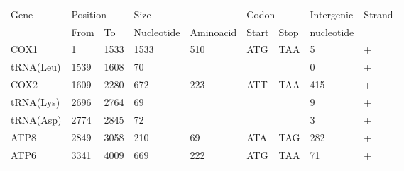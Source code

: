 \documentclass[../DISSERTACAO_MAIN.tex]{subfiles}
\begin{document}
\begin{longtable}{llllllllllllllllllllll}
			Gene         & \multicolumn{3}{l}{Position}               & \multicolumn{5}{l}{Size}                                                       & \multicolumn{6}{l}{Codon}                                     & \multicolumn{3}{l}{Intergenic}  & \multicolumn{4}{l}{Strand}             \\
			& From           & \multicolumn{2}{l}{To}    & \multicolumn{2}{l}{Nucleotide} & \multicolumn{3}{l}{Aminoacid}                 & \multicolumn{3}{l}{Start}         & \multicolumn{3}{l}{Stop}  & \multicolumn{3}{l}{nucleotide}  & \multicolumn{4}{l}{}                   \\
			COX1         & 1              & \multicolumn{2}{l}{1533}  & \multicolumn{2}{l}{1533}       & \multicolumn{3}{l}{510}                       & \multicolumn{3}{l}{ATG}           & \multicolumn{3}{l}{TAA}   & \multicolumn{3}{l}{5}           & \multicolumn{4}{l}{+}                  \\
			tRNA(Leu)    & 1539           & \multicolumn{2}{l}{1608}  & \multicolumn{2}{l}{70}         & \multicolumn{3}{l}{}                          & \multicolumn{3}{l}{}              & \multicolumn{3}{l}{}      & \multicolumn{3}{l}{0}           & \multicolumn{4}{l}{+}                  \\
			COX2         & 1609           & \multicolumn{2}{l}{2280}  & \multicolumn{2}{l}{672}        & \multicolumn{3}{l}{223}                       & \multicolumn{3}{l}{ATT}           & \multicolumn{3}{l}{TAA}   & \multicolumn{3}{l}{415}         & \multicolumn{4}{l}{+}                  \\
			tRNA(Lys)    & 2696           & \multicolumn{2}{l}{2764}  & \multicolumn{2}{l}{69}         & \multicolumn{3}{l}{}                          & \multicolumn{3}{l}{}              & \multicolumn{3}{l}{}      & \multicolumn{3}{l}{9}           & \multicolumn{4}{l}{+}                  \\
			tRNA(Asp)    & 2774           & \multicolumn{2}{l}{2845}  & \multicolumn{2}{l}{72}         & \multicolumn{3}{l}{}                          & \multicolumn{3}{l}{}              & \multicolumn{3}{l}{}      & \multicolumn{3}{l}{3}           & \multicolumn{4}{l}{+}                  \\
			ATP8         & 2849           & \multicolumn{2}{l}{3058}  & \multicolumn{2}{l}{210}        & \multicolumn{3}{l}{69}                        & \multicolumn{3}{l}{ATA}           & \multicolumn{3}{l}{TAG}   & \multicolumn{3}{l}{282}         & \multicolumn{4}{l}{+}                  \\
			ATP6         & 3341           & \multicolumn{2}{l}{4009}  & \multicolumn{2}{l}{669}        & \multicolumn{3}{l}{222}                       & \multicolumn{3}{l}{ATG}           & \multicolumn{3}{l}{TAA}   & \multicolumn{3}{l}{71}          & \multicolumn{4}{l}{+}                  \\

\end{longtable}
\end{document}
